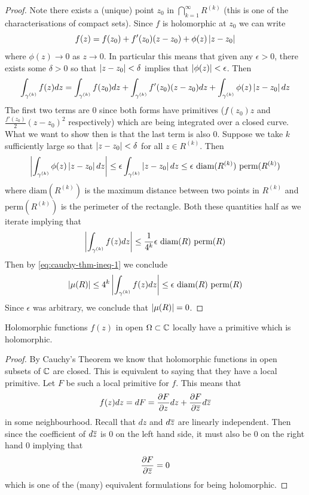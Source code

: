 \begin{proof}
Note there exists a (unique) point $z_0$ in $\bigcap_{k = 1}^\infty R^{(k)}$ (this is one of the characterisations of compact sets). Since $f$ is holomorphic at $z_0$ we can write
$$ f(z) = f(z_0) + f'(z_0)(z - z_0) + \phi(z)\left|z - z_0\right| $$
where $\phi(z) \to 0$ as $z \to 0$. In particular this means that given any $\epsilon > 0$, there exists some $\delta > 0$ so that $\left|z - z_0\right| < \delta$ implies that $\left|\phi(z)\right| < \epsilon$. Then
$$ \int_{\gamma^{(k)}} f(z) dz = \int_{\gamma^{(k)}} f(z_0) dz + \int_{\gamma^{(k)}} f'(z_0)(z - z_0) dz + \int_{\gamma^{(k)}} \phi(z)\left|z - z_0\right| dz $$
The first two terms are 0 since both forms have primitives ($f(z_0)z$ and $\frac{f'(z_0)}{2}(z - z_0)^2$ respectively) which are being integrated over a closed curve. What we want to show then is that the last term is also 0. Suppose we take $k$ sufficiently large so that $\left|z - z_0\right| < \delta$ for all $z \in R^{(k)}$. Then
$$ \left|\int_{\gamma^{(k)}} \phi(z) \left|z - z_0\right| dz\right| \leq \epsilon \int_{\gamma^{(k)}} \left|z - z_0\right| dz \leq \epsilon \text{ diam}(R^{(k)}) \text{ perm}(R^{(k)})$$
where $\text{diam}(R^{(k)})$ is the maximum distance between two points in $R^{(k)}$ and $\text{perm}(R^{(k)})$ is the perimeter of the rectangle. Both these quantities half as we iterate implying that 
$$\left|\int_{\gamma^{(k)}} f(z) dz\right| \leq \frac{1}{4^k} \epsilon \text{ diam}(R) \text{ perm}(R)$$
Then by \eqref{eq:cauchy-thm-ineq-1} we conclude
\begin{align*}
    \left|\mu(R)\right| \leq 4^k \left| \int_{\gamma^{(k)}} f(z) dz \right| \leq \epsilon \text{ diam}(R) \text{ perm}(R)
\end{align*}
Since $\epsilon$ was arbitrary, we conclude that $\left|\mu(R)\right| = 0$. 
\end{proof}

\begin{corollary}
Holomorphic functions $f(z)$ in open $\Omega \subset \mathbb{C}$ locally have a primitive which is holomorphic.
\end{corollary}
\begin{proof}
By Cauchy's Theorem we know that holomorphic functions in open subsets of $\mathbb{C}$ are closed. This is equivalent to saying that they have a local primitive. Let $F$ be such a local primitive for $f$. This means that
$$ f(z)dz = dF = \frac{\partial F}{\partial z}dz + \frac{\partial F}{\partial \overline{z}} d\overline{z} $$
in some neighbourhood.
Recall that $dz$ and $d\overline{z}$ are linearly independent. Then since the coefficient of $d\overline{z}$ is 0 on the left hand side, it must also be 0 on the right hand 0 implying that
$$ \frac{\partial F}{\partial \overline{z}} = 0 $$
which is one of the (many) equivalent formulations for being holomorphic.
\end{proof}

